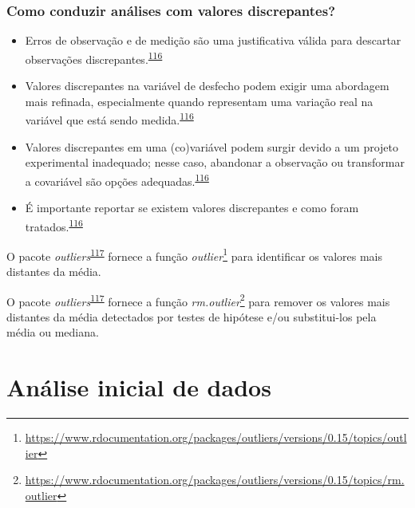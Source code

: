 \documentclass[
  a4paper,
]{book}
\renewcommand{\href}[2]{#2\footnote{\url{#1}}}
\newenvironment{infobox}[1]
  {
  \begin{itemize}
  \renewcommand{\labelitemi}{
    \raisebox{-.7\height}[0pt][0pt]{
      {\setkeys{Gin}{width=3em,keepaspectratio}
        \texttt{[image: \#1]}}
    }
  }
  \setlength{\fboxsep}{1em}
  \begin{blackbox}
  \item
  }
  {
  \end{blackbox}
  \end{itemize}
  }
\begin{document}
\hypertarget{como-conduzir-anuxe1lises-com-valores-discrepantes}{%
\subsection{Como conduzir análises com valores discrepantes?}\label{como-conduzir-anuxe1lises-com-valores-discrepantes}}

\begin{itemize}
\item
  Erros de observação e de medição são uma justificativa válida para descartar observações discrepantes.\textsuperscript{\protect\hyperlink{ref-zuur2009}{116}}
\item
  Valores discrepantes na variável de desfecho podem exigir uma abordagem mais refinada, especialmente quando representam uma variação real na variável que está sendo medida.\textsuperscript{\protect\hyperlink{ref-zuur2009}{116}}
\item
  Valores discrepantes em uma (co)variável podem surgir devido a um projeto experimental inadequado; nesse caso, abandonar a observação ou transformar a covariável são opções adequadas.\textsuperscript{\protect\hyperlink{ref-zuur2009}{116}}
\item
  É importante reportar se existem valores discrepantes e como foram tratados.\textsuperscript{\protect\hyperlink{ref-zuur2009}{116}}
\end{itemize}

\begin{infobox}{images/Rlogo}
O pacote \emph{outliers}\textsuperscript{\protect\hyperlink{ref-outliers}{117}} fornece a função \href{https://www.rdocumentation.org/packages/outliers/versions/0.15/topics/outlier}{\emph{outlier}} para identificar os valores mais distantes da média.

\end{infobox}

\begin{infobox}{images/Rlogo}
O pacote \emph{outliers}\textsuperscript{\protect\hyperlink{ref-outliers}{117}} fornece a função \href{https://www.rdocumentation.org/packages/outliers/versions/0.15/topics/rm.outlier}{\emph{rm.outlier}} para remover os valores mais distantes da média detectados por testes de hipótese e/ou substitui-los pela média ou mediana.

\end{infobox}

\hypertarget{analise-inicial-dados}{%
\chapter{\texorpdfstring{\textbf{Análise inicial de dados}}{Análise inicial de dados}}\label{analise-inicial-dados}}
\end{document}

